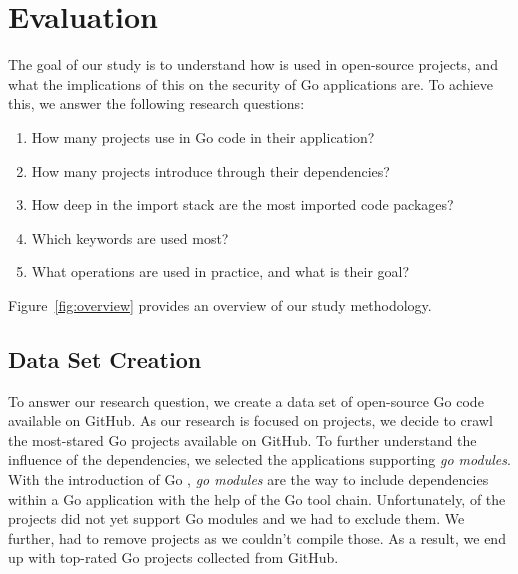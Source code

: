 \section{Evaluation}
\label{sec:eval}

The goal of our study is to understand how \unsafe{} is used in open-source projects, and what the implications of this on the security of Go applications are. 
To achieve this, we answer the following research questions:

\begin{enumerate}[leftmargin=*,label={RQ\arabic*}]
    \item How many projects use \unsafe{} in Go code in their application? \label{rq:prevalApp}
    \item How many projects introduce \unsafe{} through their dependencies? \label{rq:prevalDeps}
    \item How deep in the import stack are the most imported \unsafe{} code packages? \label{rq:depsDepth}
    \item Which \unsafe{} keywords are used most? \label{rq:distTypes}
    \item What \unsafe{} operations are used in practice, and what is their goal? \label{rq:purpose}
    
\end{enumerate}

Figure~\ref{fig:overview} provides an overview of our study methodology.




\subsection{Data Set Creation}

To answer our research question, we create a data set of open-source Go code available on GitHub.
As our research is focused on projects, we decide to crawl the \initalProjs{} most-stared Go projects available on GitHub. 
To further understand the influence of the dependencies, we selected the applications supporting \textit{go modules}.
With the introduction of Go , \textit{go modules} are the way to include dependencies within a Go application with the help of the Go tool chain. 
Unfortunately, \withoutModules{} of the projects did not yet support Go modules and we had to exclude them.
We further, had to remove \notCompiled{} projects as we couldn't compile those.
As a result, we end up with \projsAnalyzed{} top-rated Go projects collected from GitHub. 

